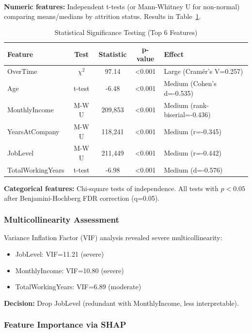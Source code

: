 \documentclass[conference]{IEEEtran}
\begin{document}
\textbf{Numeric features:} Independent t-tests (or Mann-Whitney U for non-normal) comparing means/medians by attrition status. Results in Table~\ref{tab:stat_tests_summary}.

\begin{table}[!t]
\caption{Statistical Significance Testing (Top 6 Features)}
\label{tab:stat_tests_summary}
\centering
\scriptsize
\begin{tabular}{lcccp{3cm}}
\toprule
\textbf{Feature} & \textbf{Test} & \textbf{Statistic} & \textbf{p-value} & \textbf{Effect} \\
\midrule
OverTime & $\chi^2$ & 97.14 & <0.001 & Large (Cramér's V=0.257) \\
Age & t-test & -6.48 & <0.001 & Medium (Cohen's d=-0.535) \\
MonthlyIncome & M-W U & 209,853 & <0.001 & Medium (rank-biserial=-0.436) \\
YearsAtCompany & M-W U & 118,241 & <0.001 & Medium (r=-0.345) \\
JobLevel & M-W U & 211,449 & <0.001 & Medium (r=-0.442) \\
TotalWorkingYears & t-test & -6.98 & <0.001 & Medium (d=-0.576) \\
\bottomrule
\end{tabular}
\end{table}

\textbf{Categorical features:} Chi-square tests of independence. All tests with $p<0.05$ after Benjamini-Hochberg FDR correction (q=0.05).

\subsubsection{Multicollinearity Assessment}

Variance Inflation Factor (VIF) analysis revealed severe multicollinearity:
\begin{itemize}
    \item JobLevel: VIF=11.21 (severe)
    \item MonthlyIncome: VIF=10.80 (severe)
    \item TotalWorkingYears: VIF=6.89 (moderate)
\end{itemize}

\textbf{Decision:} Drop JobLevel (redundant with MonthlyIncome, less interpretable).

\subsubsection{Feature Importance via SHAP}
\end{document}
